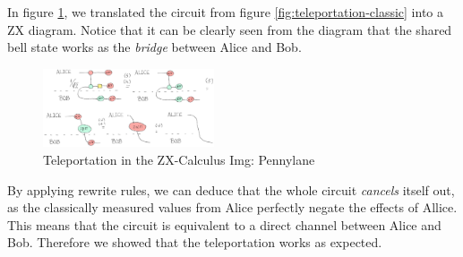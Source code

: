 In figure \ref{fig:teleportation}, we translated the circuit from figure \ref{fig:teleportation-classic} into a ZX diagram. Notice that it can be clearly seen from the diagram that the shared bell state works as the \textit{bridge} between Alice and Bob.

\begin{figure}[h]
    \centering
    \includegraphics[width=0.45\textwidth]{images/teleportation.png}
    \caption{Teleportation in the ZX-Calculus Img: Pennylane\cite{pennylane2023zx}}
    \label{fig:teleportation}
\end{figure}

By applying rewrite rules, we can deduce that the whole circuit \textit{cancels} itself out, as the classically measured values from Alice perfectly negate the effects of Allice. This means that the circuit is equivalent to a direct channel between Alice and Bob. Therefore we showed that the teleportation works as expected.
